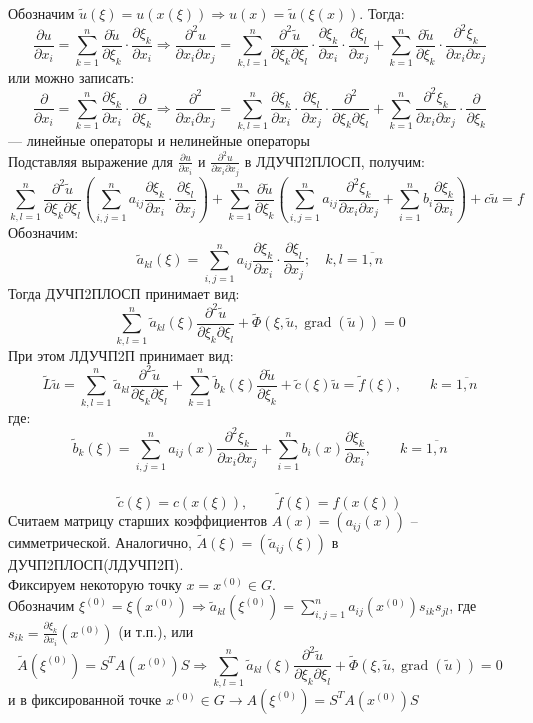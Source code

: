 Обозначим $\tilde u(\xi) = u(x(\xi)) \Longrightarrow u(x)=\tilde u(\xi(x))$. Тогда:
$$
	\frac{\partial u}{\partial x_i} = \sum^n_{k=1} \frac{\partial \tilde u}{\partial \xi_k}\cdot\frac{\partial \xi_k}{\partial x_i}
	\Longrightarrow \frac{\partial^2 u}{\partial x_i \partial x_j}=
	\sum^n_{k, l=1} \frac{\partial^2 \tilde u}{\partial \xi_k\partial \xi_l}
	\cdot\frac{\partial \xi_k}{\partial x_i}\cdot\frac{\partial \xi_l}{\partial x_j}+
	\sum^n_{k=1} \frac{\partial \tilde u}{\partial \xi_k}\cdot\frac{\partial^2 \xi_k}{\partial x_i\partial x_j}
$$
или можно записать:
$$
	\frac{\partial}{\partial x_i} = \sum^n_{k=1} \frac{\partial \xi_k}{\partial x_i}\cdot\frac{\partial}{\partial \xi_k}
	\Longrightarrow \frac{\partial^2}{\partial x_i \partial x_j}=
	\sum^n_{k, l=1} \frac{\partial \xi_k}{\partial x_i}\cdot\frac{\partial \xi_l}{\partial x_j}
	\cdot\frac{\partial^2 }{\partial \xi_k\partial \xi_l}+
	\sum^n_{k=1} \frac{\partial^2 \xi_k}{\partial x_i\partial x_j}\cdot\frac{\partial}{\partial \xi_k}
$$
--- линейные операторы и нелинейные операторы \\
Подставляя выражение для $\frac{\partial u}{\partial x_i}$ и $\frac{\partial^2 u}{\partial x_i \partial x_j}$ в ЛДУЧП2ПЛОСП, получим:
$$
	\sum_{k,l=1}^n \frac{\partial^2 \tilde u}{\partial \xi_k \partial \xi_l}( \sum_{i,j=1}^n a_{ij} \frac{\partial \xi_k}{\partial x_i}\cdot \frac{\partial \xi_l}{\partial x_j} )
	+ \sum_{k=1}^n \frac{\partial \tilde u}{\partial\xi_k}(\sum_{i,j=1}^n a_{ij}\frac{\partial^2 \xi_k}{\partial x_i \partial x_j} + \sum^n_{i=1}b_i \frac{\partial \xi_k}{\partial x_i}) + c\tilde u = f
$$%
Обозначим:
$$ \tilde a_{kl}(\xi) = \sum^n_{i,j = 1}a_{ij}\frac{\partial \xi_k }{\partial x_i}\cdot\frac{\partial \xi_l}{\partial x_j}; \quad k,l = \overline{1,n} $$
Тогда ДУЧП2ПЛОСП принимает вид:
$$ \sum^n_{k,l=1}\tilde a_{kl}(\xi) \frac{\partial^2 \tilde u}{\partial \xi_k \partial \xi_l} + \tilde \Phi(\xi, \tilde u, \operatorname{grad}(\tilde u)) = 0 $$
При этом ЛДУЧП2П принимает вид:
$$ \tilde L \tilde u = \sum^n_{k,l=1}\tilde a_{kl} \frac{\partial^2\tilde u}{\partial \xi_k \partial \xi_l} +
	\sum^n_{k=1} \tilde b_k (\xi) \frac{\partial \tilde{u}}{\partial \xi_k} + \tilde{c}(\xi)\tilde{u} = \tilde{f}(\xi), \qquad k=\overline{1,n}
$$
где: $$\displaystyle \tilde b_k(\xi) = \sum^n_{i,j=1}a_{ij}(x)\frac{\partial^2 \xi_k}{\partial x_i\partial x_j}+\sum^n_{i=1}b_i(x)\frac{\partial\xi_k}{\partial x_i},\qquad k=\overline{1,n}$$\\
$$\tilde c(\xi)=c(x(\xi)),\qquad\tilde f(\xi) = f(x(\xi))$$
Считаем матрицу старших коэффициентов $A(x)=(a_{ij}(x))$ -- симметрической. Аналогично, $ \tilde A(\xi)=(\tilde a_{ij}(\xi)) $ в ДУЧП2ПЛОСП(ЛДУЧП2П).\\
Фиксируем некоторую точку $x=x^{(0)}\in G$.\\
Обозначим $\displaystyle\xi^{(0)} = \xi(x^{(0)}) \Longrightarrow \tilde a_{kl}(\xi^{(0)}) = \sum^n_{i,j=1}a_{ij}(x^{(0)})s_{ik}s_{jl}$,
где $\displaystyle s_{ik} = \frac{\partial \xi_k}{\partial x_i}(x^{(0)})$ (и т.п.), или
$$
	\tilde A(\xi^{(0)}) = S^T A(x^{(0)}) S \Longrightarrow \sum^n_{k,l=1}\tilde a_{kl}(\xi)\frac{\partial^2 \tilde u}{\partial \xi_k \partial \xi_l}+
	\tilde\Phi(\xi,\tilde u,\operatorname{grad}(\tilde u))=0
$$
и в фиксированной точке $ x^{(0)} \in G \rightarrow A(\xi^{(0)}) = S^TA(x^{(0)})S $

